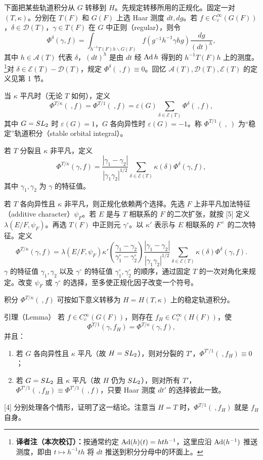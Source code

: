 下面把某些轨道积分从 $G$ 转移到 $H$。先规定转移所用的正规化。固定一对 $(T,\kappa)$。分别在 $T(F)$ 和 $G(F)$ 上选 Haar 测度 $dt,dg$。若
$f\in C_c^\infty(G(F))$，$\delta\in\mathcal D(T)$，$\gamma\in T(F)$ 在 $G$ 中正则（regular），则令
\[
\Phi^\delta(\gamma,f)=\int_{h^{-1}T(F)h\backslash G(F)}
f(g^{-1}h^{-1}\gamma hg)\frac{dg}{(dt)^h},
\]
其中 $h\in\mathcal A(T)$ 代表 $\delta$，$(dt)^h$ 是由 $dt$ 经 $\operatorname{Ad} h$ 得到的 $h^{-1}T(F)h$ 上的测度。\footnote{\textbf{译者注（本次校订）：}按通常约定 $\operatorname{Ad}(h)(t)=hth^{-1}$，这里应沿 $\operatorname{Ad}(h^{-1})$ 推送测度，即由 $t\mapsto h^{-1}th$ 将 $dt$ 推送到积分分母中的环面上。}对
$\delta\in\mathcal E(T)-\mathcal D(T)$，规定 $\Phi^\delta(\ ,f)\equiv0$。回忆 $\mathcal A(T),\mathcal D(T),\mathcal E(T)$ 的定义见第 1 节。

当 $\kappa$ 平凡时（无论 $T$ 如何），定义
\[
\Phi^{T/\kappa}(\ ,f)=\Phi^{T/1}(\ ,f)
=\varepsilon(G)\sum_{\delta\in\mathcal E(T)}\Phi^\delta(\ ,f),
\]
其中 $G=SL_2$ 时 $\varepsilon(G)=1$，$G$ 各向异性时 $\varepsilon(G)=-1$。称 $\Phi^{T/1}(\ ,\ )$ 为“稳定”轨道积分（stable orbital integral）。

若 $T$ 分裂且 $\kappa$ 非平凡，定义
\[
\Phi^{T/\kappa}(\gamma,f)=\frac{|\gamma_1-\gamma_2|}{|\gamma_1\gamma_2|^{1/2}}
\sum_{\delta\in\mathcal E(T)}\kappa(\delta)\Phi^\delta(\gamma,f),
\]
其中 $\gamma_1,\gamma_2$ 为 $\gamma$ 的特征值。

若 $T$ 各向异性且 $\kappa$ 非平凡，则正规化依赖两个选择。先选 $F$ 上非平凡加法特征（additive character）$\psi_F$。若 $E$ 是与 $T$ 相联系的 $F$ 的二次扩张，就按 [5] 定义 $\lambda(E/F,\psi_F)$。再选 $T(F)$ 中正则元 $\gamma^\circ$。以 $\kappa'$ 表示与 $E$ 相联系的 $F^\times$ 的二次特征。定义
\[
\Phi^{T/\kappa}(\gamma,f)=\lambda(E/F,\psi_F)
\kappa'\left(\frac{\gamma_1-\gamma_2}{\gamma_1^\circ-\gamma_2^\circ}\right)
\frac{|\gamma_1-\gamma_2|}{|\gamma_1\gamma_2|^{1/2}}
\sum_{\delta\in\mathcal E(T)}\kappa(\delta)\Phi^\delta(\gamma,f).
\]
$\gamma$ 的特征值 $\gamma_1,\gamma_2$ 以及 $\gamma^\circ$ 的特征值
$\gamma_1^\circ,\gamma_2^\circ$ 的顺序，通过固定 $T$ 的一次对角化来规定。改变 $\psi_F$ 或 $\gamma^\circ$ 的选择，至多使正规化因子改变一个符号。

积分 $\Phi^{T/\kappa}(\ ,f)$ 可按如下意义转移为 $H=H(T,\kappa)$ 上的稳定轨道积分。
\begin{originaltheorem}{引理（Lemma）}
若 $f\in C_c^\infty(G(F))$，则存在 $f_H\in C_c^\infty(H(F))$，使
\[
\Phi^{T/1}(\gamma,f_H)=\Phi^{T/\kappa}(\gamma,f),
\]
并且：
\begin{enumerate}
\item[(i)] 若 $G$ 各向异性且 $\kappa$ 平凡（故 $H=SL_2$），则对分裂的 $T'$，$\Phi^{T'/1}(\ ,f_H)\equiv0$；
\item[(ii)] 若 $G=SL_2$ 且 $\kappa$ 平凡（故 $H$ 仍为 $SL_2$），则对所有 $T'$，
$\Phi^{T'/1}(\ ,f_H)\equiv\Phi^{T'/1}(\ ,f)$，只要 Haar 测度 $dt'$ 的选择彼此一致。
\end{enumerate}
\end{originaltheorem}
[4] 分别处理各个情形，证明了这一结论。注意当 $H=T$ 时，$\Phi^{T/1}(\ ,f_H)$ 就是 $f_H$ 自身。


